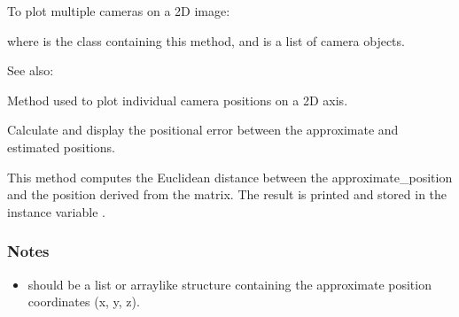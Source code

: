 \documentclass[letterpaper,10pt,english]{sphinxmanual}
\begin{document}
\begin{fulllineitems}
\begin{fulllineitems}
\sphinxAtStartPar
To plot multiple cameras on a 2D image:

\begin{sphinxVerbatim}[commandchars=\\\{\}]
  
\end{sphinxVerbatim}

\sphinxAtStartPar
where  is the class containing this method, and  is a list of camera objects.


\begin{sphinxseealso}{See also:}
\begin{description}
\sphinxAtStartPar
Method used to plot individual camera positions on a 2D axis.

\end{description}


\end{sphinxseealso}


\end{fulllineitems}


\begin{fulllineitems}
\label{\detokenize{CameraUtils:id20}}
\pysigstartsignatures
{}
\pysigstopsignatures
\sphinxAtStartPar
Calculate and display the positional error between the approximate and estimated positions.

\sphinxAtStartPar
This method computes the Euclidean distance between the approximate\_position\textasciigrave{} and the position derived from the  matrix. The result is printed and stored in the instance variable .
\subsubsection*{Notes}
\begin{itemize}
\item {} 
\sphinxAtStartPar
{} should be a list or array\sphinxhyphen{}like structure containing the
approximate position coordinates (x, y, z).


\end{itemize}
\end{fulllineitems}
\end{fulllineitems}
\end{document}
